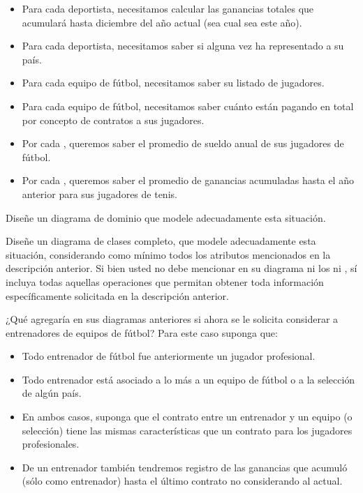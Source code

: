 \documentclass[11pt,letterpaper]{article}
\begin{document}
\begin{spacing}{1.2}
\begin{Problem}
\begin{itemize}
    \item Para cada deportista, necesitamos calcular las ganancias totales que acumulará hasta diciembre del
        año actual (sea cual sea este año).
    \item Para cada deportista, necesitamos saber si alguna vez ha representado a su país.
    \item Para cada equipo de fútbol, necesitamos saber su listado de jugadores.
    \item Para cada equipo de fútbol, necesitamos saber cuánto están pagando en total por concepto
        de contratos a sus jugadores.
    \item Por cada , queremos saber el promedio de sueldo anual de sus jugadores de fútbol.
    \item Por cada , queremos saber el promedio de ganancias acumuladas hasta el año anterior
        para sus jugadores de tenis.
\end{itemize}

\begin{ProbPart}%

    Diseñe un diagrama de dominio que modele adecuadamente esta situación.
\end{ProbPart}

\begin{ProbPart}%

    Diseñe un diagrama de clases completo, que modele adecuadamente esta situación, considerando como mínimo
    todos los atributos mencionados en la descripción anterior. Si bien usted no debe mencionar
    en su diagrama ni los  ni , sí incluya todas aquellas operaciones que
    permitan obtener toda información específicamente solicitada en la descripción anterior.

\end{ProbPart}

\begin{ProbPart}%

    ¿Qué agregaría en sus diagramas anteriores si ahora se le solicita considerar a entrenadores de equipos de fútbol?  
    Para este caso suponga que:
\begin{itemize}
    \item Todo entrenador de fútbol fue anteriormente un jugador profesional.
    \item Todo entrenador está asociado a lo más a un equipo de fútbol o a la selección de algún país.
    \item En ambos casos, suponga que el contrato entre un entrenador y un equipo (o selección) tiene las mismas características 
        que un contrato para los jugadores profesionales.
    \item De un entrenador también tendremos registro de las ganancias que acumuló (sólo como entrenador) hasta el
        último contrato no considerando al actual.
\end{itemize}


\end{ProbPart}
\end{Problem}
\end{spacing}
\end{document}
